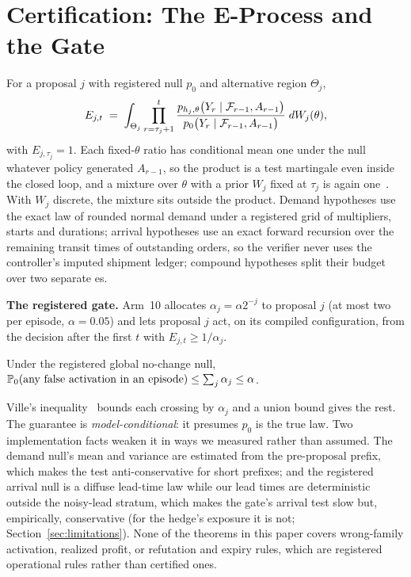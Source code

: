 \section{Certification: The E-Process and the Gate}
\label{sec:verify}
\label{sec:notclaim}

For a proposal $j$ with registered null $p_0$ and alternative region $\Theta_j$,
\begin{equation}
E_{j,t} \;=\; \int_{\Theta_j}
\prod_{r=\tau_j+1}^{t}
\frac{p_{h_j,\theta}\bigl(Y_r \mid \mathcal{F}_{r-1}, A_{r-1}\bigr)}
     {p_0\bigl(Y_r \mid \mathcal{F}_{r-1}, A_{r-1}\bigr)}
\; dW_j(\theta),
\label{eq:eprocess}
\end{equation}
with $E_{j,\tau_j} = 1$. Each fixed-$\theta$ ratio has conditional mean one under the null whatever policy generated
$A_{r-1}$, so the product is a test martingale even inside the closed loop, and a mixture over
$\theta$ with a prior $W_j$ fixed at $\tau_j$ is again one~\cite{ramdas-savi, e-detectors,
grunwald-safe-testing}. With $W_j$ discrete, the mixture sits outside the product. Demand
hypotheses use the exact law of rounded normal demand under a registered grid of multipliers,
starts and durations; arrival hypotheses use an exact forward recursion over the remaining
transit times of outstanding orders, so the verifier never uses the controller's imputed
shipment ledger; compound hypotheses split their budget over two separate
\eprocess{}es.

\textbf{The registered gate.} Arm~10 allocates $\alpha_j = \alpha 2^{-j}$ to proposal $j$ (at
most two per episode, $\alpha = 0.05$) and lets proposal $j$ act, on its compiled configuration,
from the decision after the first $t$ with $E_{j,t} \ge 1/\alpha_j$.

\begin{theorem}
\label{thm:activation}
Under the registered global no-change null, $\mathbb{P}_0(\text{any false activation in an
episode}) \le \sum_j \alpha_j \le \alpha$.
\end{theorem}

Ville's inequality~\cite{ville} bounds each crossing by $\alpha_j$ and a union bound gives the
rest. The guarantee is \emph{model-conditional}: it presumes $p_0$ is the true law. Two
implementation facts weaken it in ways we measured rather than assumed. The demand null's mean
and variance are estimated from the pre-proposal prefix, which makes the test anti-conservative
for short prefixes; and the registered arrival null is a diffuse lead-time law while our lead
times are deterministic outside the noisy-lead stratum, which makes the gate's arrival test slow
but, empirically, conservative (for the hedge's exposure it is not; Section~\ref{sec:limitations}). None of
the theorems in this paper covers wrong-family activation, realized profit, or
refutation and expiry rules, which are registered operational rules rather than certified ones.

